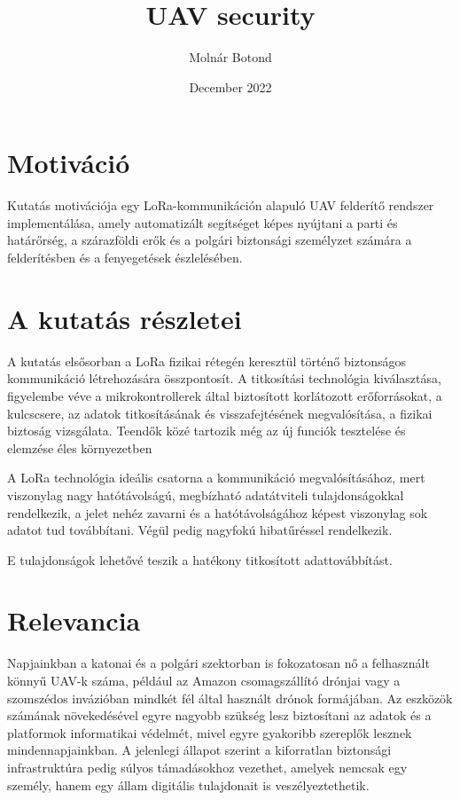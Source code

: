 \documentclass{article}
\title{UAV security}
\author{Molnár Botond}
\date{December 2022}
\begin{document}
\maketitle

\section{Motiváció}

Kutatás motivációja egy LoRa-kommunikáción alapuló UAV felderítő rendszer implementálása, amely automatizált segítséget képes nyújtani a parti és határőrség, a szárazföldi erők és a polgári biztonsági személyzet számára a felderítésben és a fenyegetések észlelésében.

\section{A kutatás részletei}

\begin{flushleft}
A kutatás elsősorban a LoRa fizikai rétegén keresztül történő biztonságos kommunikáció létrehozására összpontosít. A titkosítási technológia kiválasztása, figyelembe véve a mikrokontrollerek által biztosított korlátozott erőforrásokat, a kulcscsere, az adatok titkosításának és visszafejtésének megvalósítása, a fizikai biztoság vizsgálata.
Teendők közé tartozik még az új funciók tesztelése és elemzése éles környezetben

A LoRa technológia ideális csatorna a kommunikáció megvalósításához, mert viszonylag nagy hatótávolságú, megbízható adatátviteli tulajdonságokkal rendelkezik, a jelet nehéz zavarni és a hatótávolságához képest viszonylag sok adatot tud továbbítani. Végül pedig nagyfokú hibatűréssel rendelkezik.

E tulajdonságok lehetővé teszik a hatékony titkosított adattovábbítást.
\end{flushleft}

\section{Relevancia}

\begin{flushleft}
Napjainkban a katonai és a polgári szektorban is fokozatosan nő a felhasznált könnyű UAV-k száma, például az Amazon csomagszállító drónjai vagy a szomszédos invázióban mindkét fél által használt drónok formájában. Az eszközök számának növekedésével egyre nagyobb szükség lesz biztosítani az adatok és a platformok informatikai védelmét, mivel egyre gyakoribb szereplők lesznek mindennapjainkban. A jelenlegi állapot szerint a kiforratlan biztonsági infrastruktúra pedig súlyos támadásokhoz vezethet, amelyek nemcsak egy személy, hanem egy állam digitális tulajdonait is veszélyeztethetik.
\end{flushleft}
\end{document}
